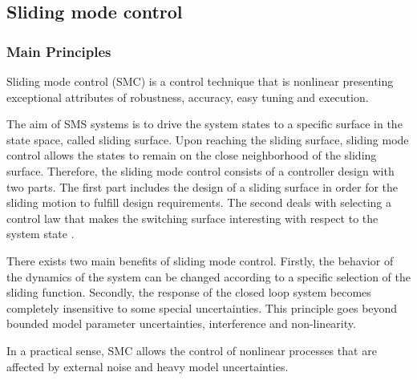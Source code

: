 \documentclass{thesisreport}
\begin{document}







 \newpage
 \subsection{Sliding mode control}
 
 
 
  \subsubsection{Main Principles}
 
 
 
Sliding mode control (SMC) is a control technique that is nonlinear presenting exceptional attributes of robustness,
accuracy, easy tuning and execution.
 
The aim of SMS systems is to drive the system states to a specific surface in the state space, called sliding surface. Upon
reaching the sliding surface, sliding mode control allows the states to remain on the close neighborhood of the sliding
surface. Therefore, the sliding mode control consists of a controller design with two parts. The first part includes the
design of a sliding surface in order for the sliding motion to fulfill design requirements. The second deals with selecting a
control law that makes the switching surface interesting with respect to the system state \cite{Utkin1997}.




There exists two main benefits of sliding mode control. Firstly, the behavior of the dynamics of the system can be changed
according to a specific selection of the sliding function. Secondly, the response of the closed loop system becomes completely
insensitive to some special uncertainties. This principle goes beyond bounded model parameter uncertainties, interference and non-linearity.

In a practical sense, SMC allows the control of nonlinear processes that are affected by external noise and heavy model uncertainties.
\end{document}
